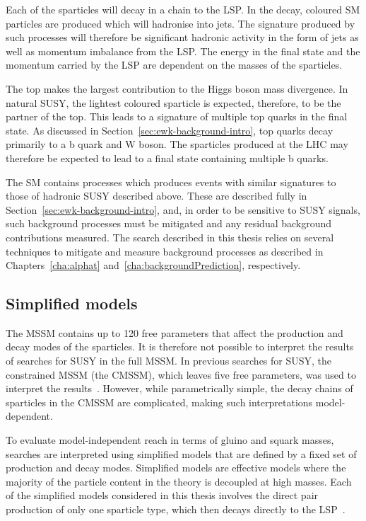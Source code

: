 Each of the sparticles will decay in a chain to the LSP. In the decay, 
coloured SM particles are produced which will hadronise into jets.
The signature produced by such processes will therefore be significant hadronic activity in 
the form of jets as well as momentum imbalance from the LSP. The energy in
the final state and the momentum carried by the LSP are dependent on the masses
of the sparticles.

The top makes the largest contribution to the Higgs boson mass divergence. In natural SUSY, 
the lightest coloured sparticle is expected, therefore, to be the partner of the top. This leads to a signature
of multiple top quarks in the final state. As discussed in Section~\ref{sec:ewk-background-intro}, top quarks
decay primarily to a b quark and W boson. The sparticles produced at the LHC 
may therefore be expected to lead to a final state containing multiple b quarks.

The SM contains processes which produces events with similar signatures to 
those of hadronic SUSY described above. These are described fully in Section~\ref{sec:ewk-background-intro},
and, in order to be sensitive to SUSY signals, such background processes must be mitigated 
and any residual background contributions measured. The search described in this thesis relies on several
techniques to mitigate and measure background processes as described in Chapters~\ref{cha:alphat} and~\ref{cha:backgroundPrediction},
respectively.

\subsection{Simplified models}

The MSSM contains up to 120 free parameters that affect the production and decay modes of the sparticles.
It is therefore not possible to interpret the results of searches for SUSY in the full MSSM. 
In previous searches for SUSY, the constrained MSSM (the CMSSM), which leaves five free parameters, was 
used to interpret the results~\cite{CMSSM}. However, while parametrically simple, the decay chains of sparticles 
in the CMSSM are complicated, making such interpretations model-dependent. 

To evaluate model-independent reach in terms of gluino and squark masses, searches are interpreted using 
simplified models that are defined by a fixed set of production and decay modes.
Simplified models are effective models where the majority of the particle content in the theory 
is decoupled at high masses. Each of the simplified models considered in this thesis involves
the direct pair production of only one sparticle type, which then decays directly to the LSP~\cite{SMS}.

